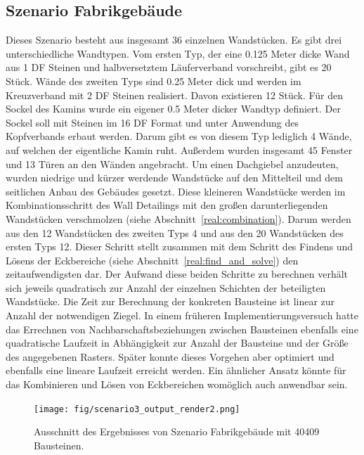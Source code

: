\subsection{Szenario Fabrikgebäude}\label{poc:scenario3}
Dieses Szenario besteht aus insgesamt 36 einzelnen Wandstücken.
Es gibt drei unterschiedliche Wandtypen.
Vom ersten Typ, der eine 0.125 Meter dicke Wand aus 1 DF Steinen und halbversetztem Läuferverband vorschreibt, gibt es 20 Stück.
Wände des zweiten Typs sind 0.25 Meter dick und werden im Kreuzverband mit 2 DF Steinen realisiert.
Davon existieren 12 Stück.
Für den Sockel des Kamins wurde ein eigener 0.5 Meter dicker Wandtyp definiert.
Der Sockel soll mit Steinen im 16 DF Format und unter Anwendung des Kopfverbands erbaut werden.
Darum gibt es von diesem Typ lediglich 4 Wände, auf welchen der eigentliche Kamin ruht.
Außerdem wurden insgesamt 45 Fenster und 13 Türen an den Wänden angebracht.
Um einen Dachgiebel anzudeuten, wurden niedrige und kürzer werdende Wandstücke auf den Mittelteil und dem seitlichen Anbau des Gebäudes gesetzt.
Diese kleineren Wandstücke werden im Kombinationsschritt des Wall Detailings mit den großen darunterliegenden Wandstücken verschmolzen (siehe Abschnitt~\ref{real:combination}).
Darum werden aus den 12 Wandstücken des zweiten Typs 4 und aus den 20 Wandstücken des ersten Typs 12.
Dieser Schritt stellt zusammen mit dem Schritt des Findens und Lösens der Eckbereiche (siehe Abschnitt~\ref{real:find_and_solve}) den zeitaufwendigsten dar.
Der Aufwand diese beiden Schritte zu berechnen verhält sich jeweils quadratisch zur Anzahl der einzelnen Schichten der beteiligten Wandstücke.
Die Zeit zur Berechnung der konkreten Bausteine ist linear zur Anzahl der notwendigen Ziegel.
In einem früheren Implementierungsversuch hatte das Errechnen von Nachbarschaftsbeziehungen zwischen Bausteinen ebenfalls eine quadratische Laufzeit in Abhängigkeit zur Anzahl der Bausteine und der Größe des angegebenen Rasters.
Später konnte dieses Vorgehen aber optimiert und ebenfalls eine lineare Laufzeit erreicht werden.
Ein ähnlicher Ansatz könnte für das Kombinieren und Lösen von Eckbereichen womöglich auch anwendbar sein.

\begin{figure}[t]
  \centering
  \texttt{[image: fig/scenario3\_output\_render2.png]}
  \caption{Ausschnitt des Ergebnisses von Szenario Fabrikgebäude mit 40409 Bausteinen.}\label{fig:poc:scenario3}
\end{figure}

